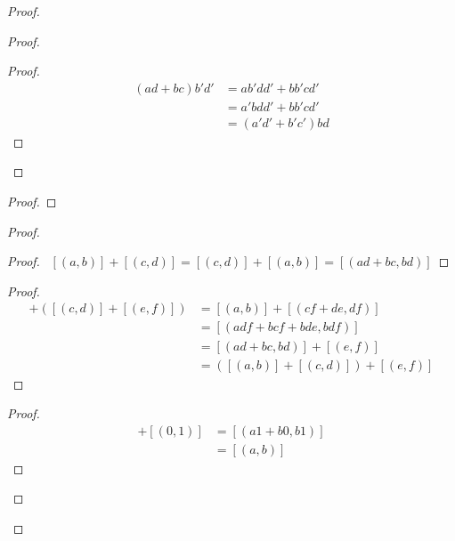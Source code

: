 \documentclass{article}
\theoremstyle{definition}
\begin{document}
\begin{proof}
\begin{proof}
\begin{proof}
                \begin{align*}
                    (ad+bc)b'd' & = ab'dd' + bb'cd' \\
                    & = a'bdd' + bb'cd' \\
                    & = (a'd'+b'c')bd
                \end{align*}
            \end{proof}
        \end{proof}
        \begin{proof}
        \end{proof}
        \begin{proof}
            \begin{proof}
                \pf\ $[(a,b)] + [(c,d)] = [(c,d)] + [(a,b)] = [(ad+bc,bd)]$
            \end{proof}
            \begin{proof}
                \pf
                \begin{align*}
                    [(a,b)] + ([(c,d)] + [(e,f)])
                    & = [(a,b)] + [(cf+de,df)] \\
                    & = [(adf + bcf + bde, bdf)] \\
                    & = [(ad + bc,bd)] + [(e,f)] \\
                    & = ([(a,b)] + [(c,d)]) + [(e,f)]
                \end{align*}
            \end{proof}
            \begin{proof}
                \pf
                \begin{align*}
                    [(a,b)] + [(0,1)]
                    & = [(a1+b0,b1)] \\
                    & = [(a,b)]
                \end{align*}
            \end{proof}

\end{proof}
\end{proof}
\end{document}
